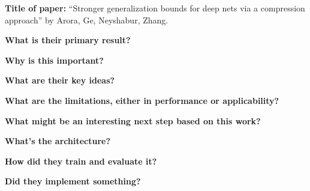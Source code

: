 \noindent \textbf{Title of paper:} ``Stronger generalization bounds for deep
nets via a compression approach'' by Arora, Ge, Neyshabur, Zhang. 

\noindent\textbf{What is their primary result?}

\noindent\textbf{Why is this important?}

\noindent\textbf{What are their key ideas?}

\noindent\textbf{What are the limitations, either in performance or applicability?}

\noindent\textbf{What might be an interesting next step based on this work?}

\noindent\textbf{What's the architecture?}

\noindent\textbf{How did they train and evaluate it?}

\noindent\textbf{Did they implement something?}



